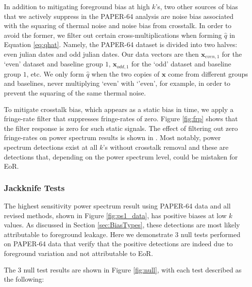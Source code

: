 \documentclass[preprint2,numberedappendix,tighten]{aastex6}  %
\begin{document}
In addition to mitigating foreground bias at high $k$'s, two other sources of bias that we actively suppress in the PAPER-64 analysis are noise bias associated with the squaring of thermal noise and noise bias from crosstalk. In order to avoid the former, we filter out certain cross-multiplications when forming $\hat{q}$ in Equation \eqref{eq:qhat}. Namely, the PAPER-64 dataset is divided into two halves: even julian dates and odd julian dates. Our data vectors are then $\textbf{x}_{even, 1}$ for the `even' dataset and baseline group $1$, $\textbf{x}_{odd, 1}$ for the `odd' dataset and baseline group $1$, etc. We only form $\hat{q}$ when the two copies of $\textbf{x}$ come from different groups and baselines, never multiplying `even' with `'even', for example, in order to prevent the squaring of the same thermal noise.

To mitigate crosstalk bias, which appears as a static bias in time, we apply a fringe-rate filter that suppresses fringe-rates of zero. Figure \ref{fig:frp} shows that the filter response is zero for such static signals. The effect of filtering out zero fringe-rates on power spectrum results is shown in \citet{ali_et_al2015}. Most notably, power spectrum detections exist at all $k$'s without crosstalk removal and these are detections that, depending on the power spectrum level, could be mistaken for EoR. 

\subsubsection{Jackknife Tests}

The highest sensitivity power spectrum result using PAPER-64 data and all revised methods, shown in Figure \ref{fig:ps1_data}, has positive biases at low $k$ values. As discussed in Section \ref{sec:BiasTypes}, these detections are most likely attributable to foreground leakage. Here we demonstrate $3$ null tests performed on PAPER-64 data that verify that the positive detections are indeed due to foreground variation and not attributable to EoR.

The $3$ null test results are shown in Figure \ref{fig:null}, with each test described as the following:
\end{document}
